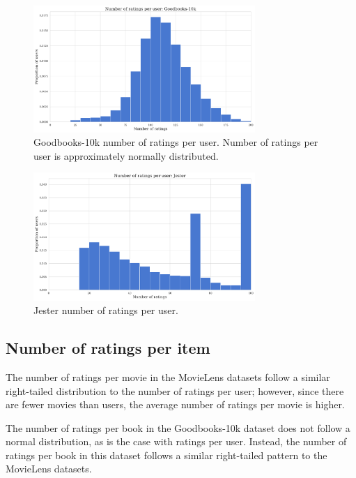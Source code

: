 \begin{figure}[H]
\centering
\includegraphics[width=0.75\textwidth]{Figures/3_ratings-distributions/goodbooks_user-ratings.pdf}
\caption{Goodbooks-10k number of ratings per user. Number of ratings per user is approximately normally distributed.}
\label{fig:goodbooks-users}
\end{figure}

\begin{figure}[H]
\centering
\includegraphics[width=0.75\textwidth]{Figures/3_ratings-distributions/jester_user-ratings.pdf}
\caption{Jester number of ratings per user.}
\label{fig:jester-users}
\end{figure}

\subsection{Number of ratings per item}
The number of ratings per movie in the MovieLens datasets follow a similar right-tailed distribution to the number of ratings per user; however, since there are fewer movies than users, the average number of ratings per movie is higher.

The number of ratings per book in the Goodbooks-10k dataset does not follow a normal distribution, as is the case with ratings per user. Instead, the number of ratings per book in this dataset follows a similar right-tailed pattern to the MovieLens datasets.

